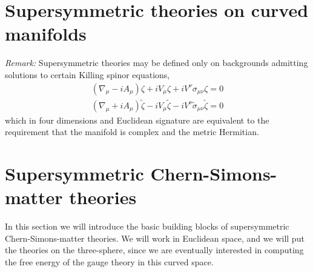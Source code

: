 \section{Supersymmetric theories on curved manifolds}
\textit{Remark:} Supersymmetric theories may be defined only on backgrounds admitting solutions to certain Killing spinor equations,
\begin{align}
\left(\nabla_\mu-iA_\mu\right)\zeta + iV_\mu\zeta + iV^\nu\sigma_{\mu\nu}\zeta = 0\\
\left(\nabla_\mu+iA_\mu\right)\tilde{\zeta} - iV_\mu\tilde{\zeta} -  iV^\nu\tilde{\sigma}_{\mu\nu}\tilde{\zeta} = 0
\end{align}
which in four dimensions and Euclidean signature are
equivalent to the requirement that the manifold is complex and the metric Hermitian.

\section{Supersymmetric Chern-Simons-matter theories}

In this section we will introduce the basic building blocks of supersymmetric
Chern-Simons-matter theories. We will work in Euclidean space, and we will put
the theories on the three-sphere, since we are eventually interested in
computing the free energy of the gauge theory in this curved space. 
